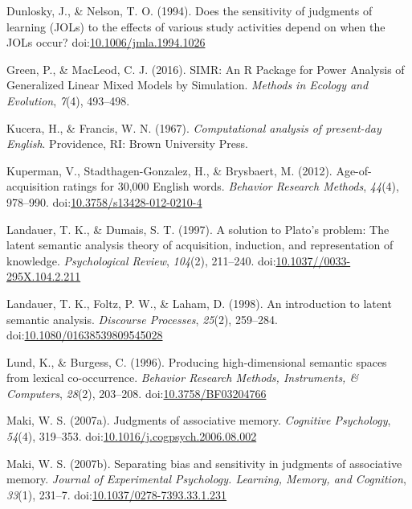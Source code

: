 \documentclass[english,man]{apa6}
\theoremstyle{definition}
\theoremstyle{definition}
\theoremstyle{definition}
\theoremstyle{remark}
\begin{document}
\hypertarget{ref-Dunlosky1994a}{}
Dunlosky, J., \& Nelson, T. O. (1994). Does the sensitivity of judgments
of learning (JOLs) to the effects of various study activities depend on
when the JOLs occur?
doi:\href{https://doi.org/10.1006/jmla.1994.1026}{10.1006/jmla.1994.1026}

\hypertarget{ref-Green2016}{}
Green, P., \& MacLeod, C. J. (2016). SIMR: An R Package for Power
Analysis of Generalized Linear Mixed Models by Simulation. \emph{Methods
in Ecology and Evolution}, \emph{7}(4), 493--498.

\hypertarget{ref-Kucera1967}{}
Kucera, H., \& Francis, W. N. (1967). \emph{Computational analysis of
present-day English}. Providence, RI: Brown University Press.

\hypertarget{ref-Kuperman2012}{}
Kuperman, V., Stadthagen-Gonzalez, H., \& Brysbaert, M. (2012).
Age-of-acquisition ratings for 30,000 English words. \emph{Behavior
Research Methods}, \emph{44}(4), 978--990.
doi:\href{https://doi.org/10.3758/s13428-012-0210-4}{10.3758/s13428-012-0210-4}

\hypertarget{ref-Landauer1997}{}
Landauer, T. K., \& Dumais, S. T. (1997). A solution to Plato's problem:
The latent semantic analysis theory of acquisition, induction, and
representation of knowledge. \emph{Psychological Review}, \emph{104}(2),
211--240.
doi:\href{https://doi.org/10.1037//0033-295X.104.2.211}{10.1037//0033-295X.104.2.211}

\hypertarget{ref-Landauer1998}{}
Landauer, T. K., Foltz, P. W., \& Laham, D. (1998). An introduction to
latent semantic analysis. \emph{Discourse Processes}, \emph{25}(2),
259--284.
doi:\href{https://doi.org/10.1080/01638539809545028}{10.1080/01638539809545028}

\hypertarget{ref-Lund1996}{}
Lund, K., \& Burgess, C. (1996). Producing high-dimensional semantic
spaces from lexical co-occurrence. \emph{Behavior Research Methods,
Instruments, \& Computers}, \emph{28}(2), 203--208.
doi:\href{https://doi.org/10.3758/BF03204766}{10.3758/BF03204766}

\hypertarget{ref-Maki2007a}{}
Maki, W. S. (2007a). Judgments of associative memory. \emph{Cognitive
Psychology}, \emph{54}(4), 319--353.
doi:\href{https://doi.org/10.1016/j.cogpsych.2006.08.002}{10.1016/j.cogpsych.2006.08.002}

\hypertarget{ref-Maki2007}{}
Maki, W. S. (2007b). Separating bias and sensitivity in judgments of
associative memory. \emph{Journal of Experimental Psychology. Learning,
Memory, and Cognition}, \emph{33}(1), 231--7.
doi:\href{https://doi.org/10.1037/0278-7393.33.1.231}{10.1037/0278-7393.33.1.231}
\end{document}
